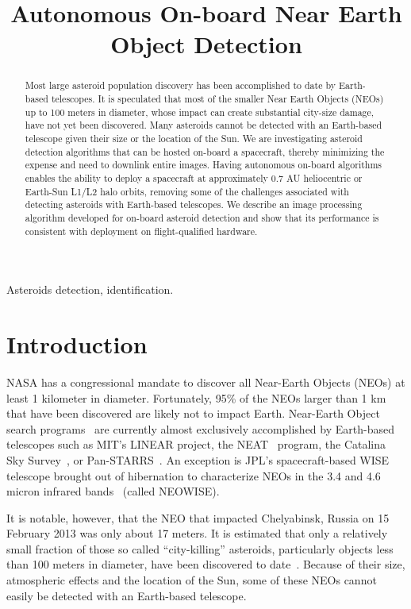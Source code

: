 \documentclass{article}
\title{ Autonomous On-board Near Earth Object Detection
}
\begin{document}
%
\maketitle
%
\begin{abstract}
Most large asteroid population discovery has been accomplished to date by Earth-based telescopes. It is speculated that most of the smaller Near Earth Objects (NEOs) up to 100 meters in diameter, whose impact can create substantial city-size damage, have not yet been discovered. Many asteroids cannot be detected with an Earth-based telescope given their size or the location of the Sun. We are investigating asteroid detection algorithms that can be hosted on-board a spacecraft, thereby minimizing the expense and need to downlink entire images. Having autonomous on-board algorithms enables the ability to deploy a spacecraft at approximately 0.7 AU heliocentric or Earth-Sun L1/L2 halo orbits, removing some of the challenges associated with detecting asteroids with Earth-based telescopes. We describe an image processing algorithm developed for on-board asteroid detection and show that its performance is consistent with deployment on flight-qualified hardware.
 
\end{abstract}
%
\begin{keywords}
Asteroids detection, identification. 
\end{keywords}
%
\section{Introduction}
\label{sec:intro}

NASA has a congressional mandate to discover all Near-Earth Objects (NEOs) at least 1 kilometer in diameter.  Fortunately, 95\% of the NEOs larger than 1 km that have been discovered are likely not to impact Earth.  
Near-Earth Object search programs~\cite{stokes2002near} are currently almost exclusively accomplished by Earth-based telescopes such as MIT's LINEAR \cite{evans2003detection}  project, the NEAT~\cite{neat2014} program, the Catalina Sky Survey~\cite{css2014}, or  Pan-STARRS~\cite{denneau2013pan}.  An exception is JPL's spacecraft-based WISE telescope brought out of hibernation to characterize NEOs in the 3.4 and 4.6 micron infrared bands~\cite{wise2014} (called NEOWISE). 

It is notable, however, that the NEO that impacted Chelyabinsk, Russia on 15 February 2013 was only about 17 meters.
It is estimated that only a relatively small fraction of those so called ``city-killing'' asteroids, particularly objects less than 100 meters in diameter, have been discovered to date~\cite{neo2015}. Because of their size, atmospheric effects and the location of the Sun, some of these NEOs cannot easily be detected with an Earth-based telescope.  
\end{document}
